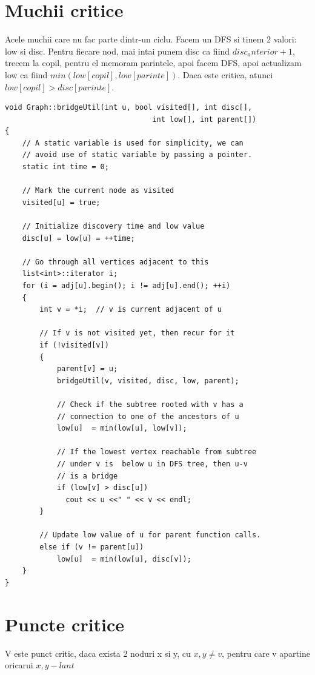 \documentclass{article}
\begin{document}
\section{Muchii critice} Acele muchii care nu fac parte dintr-un ciclu. Facem un DFS si tinem 2 valori: low si disc. Pentru fiecare nod, mai intai punem disc ca fiind $disc_anterior + 1$, trecem la copil, pentru el memoram parintele, apoi facem DFS, apoi actualizam low ca fiind $min(low[copil], low[parinte])$. Daca este critica, atunci $low[copil]>disc[parinte]$.
\begin{lstlisting}
void Graph::bridgeUtil(int u, bool visited[], int disc[],
                                  int low[], int parent[])
{
    // A static variable is used for simplicity, we can
    // avoid use of static variable by passing a pointer.
    static int time = 0;
 
    // Mark the current node as visited
    visited[u] = true;
 
    // Initialize discovery time and low value
    disc[u] = low[u] = ++time;
 
    // Go through all vertices adjacent to this
    list<int>::iterator i;
    for (i = adj[u].begin(); i != adj[u].end(); ++i)
    {
        int v = *i;  // v is current adjacent of u
 
        // If v is not visited yet, then recur for it
        if (!visited[v])
        {
            parent[v] = u;
            bridgeUtil(v, visited, disc, low, parent);
 
            // Check if the subtree rooted with v has a
            // connection to one of the ancestors of u
            low[u]  = min(low[u], low[v]);
 
            // If the lowest vertex reachable from subtree
            // under v is  below u in DFS tree, then u-v
            // is a bridge
            if (low[v] > disc[u])
              cout << u <<" " << v << endl;
        }
 
        // Update low value of u for parent function calls.
        else if (v != parent[u])
            low[u]  = min(low[u], disc[v]);
    }
}
    \end{lstlisting}

\section{Puncte critice} V este punct critic, daca exista 2 noduri x si y, cu $x,y \neq v$, pentru care v apartine oricarui $x,y-lant$
\end{document}
